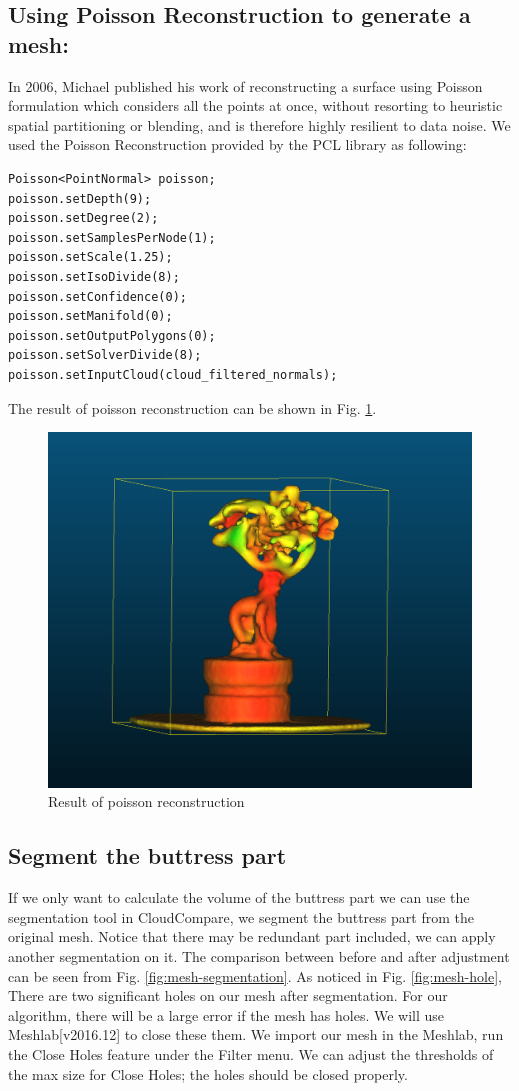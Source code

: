 \documentclass[runningheads,a4paper]{llncs}
\begin{document}
\subsection{Using Poisson Reconstruction to generate a mesh:}
In 2006, Michael published his work of reconstructing a surface using Poisson
formulation which considers all the points at once, without resorting to heuristic spatial partitioning or blending, and is therefore highly resilient to data noise. We used the Poisson Reconstruction provided by the PCL library as following:
\begin{lstlisting}
Poisson<PointNormal> poisson;
poisson.setDepth(9);
poisson.setDegree(2);
poisson.setSamplesPerNode(1);
poisson.setScale(1.25);
poisson.setIsoDivide(8);
poisson.setConfidence(0);
poisson.setManifold(0);
poisson.setOutputPolygons(0);
poisson.setSolverDivide(8);
poisson.setInputCloud(cloud_filtered_normals);
\end{lstlisting}
The result of poisson reconstruction can be shown in Fig. \ref{fig:tree-mesh}.

\begin{figure}
\centering
\includegraphics[scale=0.4]{tree_mesh.PNG}
\caption{Result of poisson reconstruction}
\label{fig:tree-mesh}
\end{figure}

\subsection{Segment the buttress part}
If we only want to calculate the volume of the buttress part we can use the segmentation tool in CloudCompare, we segment the buttress part from the original mesh. Notice that there may be redundant part included, we can apply another segmentation on it. The comparison between before and after adjustment can be seen from Fig. \ref{fig:mesh-segmentation}. As noticed in Fig. \ref{fig:mesh-hole}, There are two significant holes on our mesh after segmentation. For our algorithm, there will be a large error if the mesh has holes. We will use Meshlab[v2016.12] to close these them. We import our mesh in the Meshlab, run the Close Holes feature under the Filter menu. 
We can adjust the thresholds of the max size for Close Holes; the holes should be closed properly. 
\end{document}
